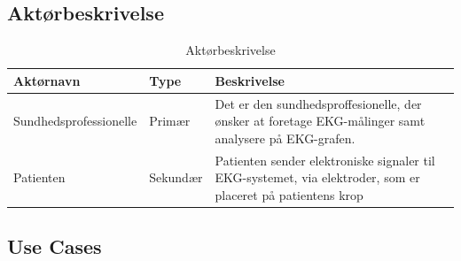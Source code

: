\subsection{Aktørbeskrivelse}

\begin{table}[H]
\begin{tabularx}{\textwidth}{l l X}
    \toprule
     Aktørnavn  & Type      & Beskrivelse \\ \midrule
     Sundhedsprofessionelle   & Primær    & Det er den sundhedsproffesionelle, der ønsker at foretage EKG-målinger samt analysere på EKG-grafen.\\ 						  									  \addlinespace[2mm]
     Patienten & Sekundær  & Patienten sender elektroniske signaler til EKG-systemet, via elektroder, som er placeret på patientens krop\\                                                                                                                                                                            
   
     \bottomrule                                                                                                                   
    \end{tabularx}
    \caption {Aktørbeskrivelse}
    \label{tab:aktoerbeskrivelse}
	
\end{table}

\subsection{Use Cases}

